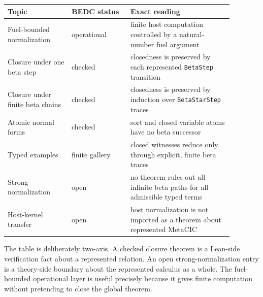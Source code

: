 \begin{center}
\begin{tabular}{p{0.25\linewidth}p{0.23\linewidth}p{0.40\linewidth}}
\hline
Topic & BEDC status & Exact reading \\
\hline
Fuel-bounded normalization &
operational &
finite host computation controlled by a natural-number fuel argument \\
Closure under one beta step &
checked &
closedness is preserved by each represented \texttt{BetaStep} transition \\
Closure under finite beta chains &
checked &
closedness is preserved by induction over \texttt{BetaStarStep} traces \\
Atomic normal forms &
checked &
sort and closed variable atoms have no beta successor \\
Typed examples &
finite gallery &
closed witnesses reduce only through explicit, finite beta traces \\
Strong normalization &
open &
no theorem rules out all infinite beta paths for all admissible typed terms \\
Host-kernel transfer &
open &
host normalization is not imported as a theorem about represented MetaCIC \\
\hline
\end{tabular}
\end{center}

The table is deliberately two-axis. A checked closure theorem is a Lean-side
verification fact about a represented relation. An open strong-normalization
entry is a theory-side boundary about the represented calculus as a whole.
The fuel-bounded operational layer is useful precisely because it gives finite
computation without pretending to close the global theorem.
